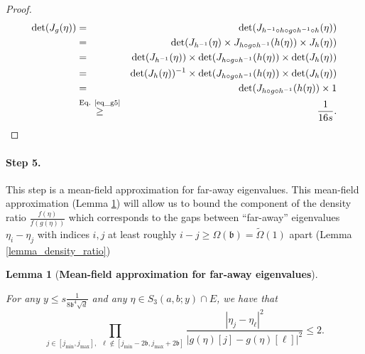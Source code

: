 \documentclass[11pt,letterpaper]{article}
\newtheorem{lemma}[theorem]{Lemma}
\begin{document}
\begin{proof}
\begin{eqnarray*}
    \mathrm{det}(J_{g}(\eta)) &= &  \mathrm{det}(J_{  h^{-1} \circ h \circ g \circ h^{-1} \circ h}(\eta)) \\ 
    &=& \mathrm{det}( J_{h^{-1}}(\eta) \times J_{h \circ g \circ h^{-1}}(h(\eta))  \times J_{h}(\eta))\\
    &= & \mathrm{det}(J_{h^{-1}}(\eta)) \times \mathrm{det}(J_{h \circ g \circ h^{-1}}(h(\eta))  \times \mathrm{det}(J_{h}(\eta))\\
        &= & \mathrm{det}(J_{h}(\eta))^{-1} \times \mathrm{det}(J_{h \circ g \circ h^{-1}}(h(\eta))  \times \mathrm{det}(J_{h}(\eta))\\
    &=&\mathrm{det}(J_{h \circ g \circ h^{-1}}(h(\eta))  \times 1\\
    &\stackrel{\textrm{Eq. \eqref{eq_g5}}}{\geq}& \frac{1}{16s}.
\end{eqnarray*}
%
%
\end{proof}

\paragraph{Step 5.} {This step is a mean-field approximation for far-away eigenvalues.}
This mean-field approximation (Lemma \ref{lemma_mean_field}) will allow us to bound the component of the density ratio $\frac{f(\eta)}{f(g(\eta))}$ which corresponds to the gaps between ``far-away'' eigenvalues $\eta_i - \eta_j$ with indices $i,j$ at least roughly $i-j \geq \Omega(\mathfrak{b}) = \tilde{\Omega}(1)$ apart (Lemma \ref{lemma_density_ratio})

\begin{lemma}[\bf Mean-field approximation for far-away eigenvalues]\label{lemma_mean_field}

For any $y \leq s\frac{1}{8\mathfrak{b}^4\sqrt{d} }$ and any $\eta\in  S_3(a,b;y) \cap E$, we have that
%
\begin{equation}
\prod_{j \in [j_{\mathrm{min}} , j_{\mathrm{max}}] , \, \, \, \ell \notin [j_{\mathrm{min}} - 2\mathfrak{b} , j_{\mathrm{max}} + 2\mathfrak{b}]} \frac{| \eta_{j} - \eta_\ell|^2}{| g(\eta)[j] - g(\eta)[\ell]|^2}  \leq 2.
\end{equation}

\end{lemma}
\end{document}
